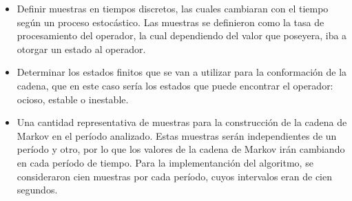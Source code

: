 \begin{itemize}
	\item Definir muestras en tiempos discretos, las cuales cambiaran con el tiempo según un proceso estocástico. Las muestras se definieron como la tasa de procesamiento del operador, la cual dependiendo del valor que poseyera, iba a otorgar un estado al operador.
	\item Determinar los estados finitos que se van a utilizar para la conformación de la cadena, que en este caso sería los estados que puede encontrar el operador: ocioso, estable o inestable.
	\item Una cantidad representativa de muestras para la construcción de la cadena de Markov en el período analizado. Estas muestras serán independientes de un período y otro, por lo que los valores de la cadena de Markov irán cambiando en cada período de tiempo. Para la implementanción del algoritmo, se consideraron cien muestras por cada período, cuyos intervalos eran de cien segundos.
\end{itemize}



